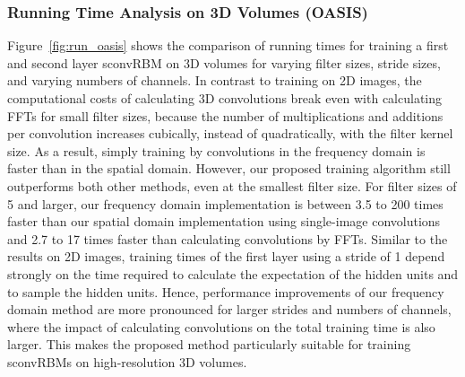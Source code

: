 \subsubsection{Running Time Analysis on 3D Volumes (OASIS)}

Figure~\ref{fig:run_oasis} shows the comparison of running times for training a
first  and second layer sconvRBM on 3D volumes for varying filter sizes, stride
sizes, and varying numbers of channels. In contrast to training on 2D images,
the computational costs of calculating 3D convolutions break even with
calculating FFTs for small filter sizes, because the number of multiplications
and additions per convolution increases cubically, instead of quadratically,
with the filter kernel size. As a result, simply training by convolutions in the
frequency domain is faster than in the spatial domain. However, our proposed
training algorithm still outperforms both other methods, even at the smallest
filter size. For filter sizes of 5 and larger, our frequency domain
implementation is between 3.5 to 200 times faster than our spatial domain
implementation using single-image convolutions and 2.7 to 17 times faster than
calculating convolutions by FFTs. Similar to the results on 2D images, training
times of the first layer using a stride of 1 depend strongly on the time
required to calculate the expectation of the hidden units and to sample the
hidden units. Hence, performance improvements of our frequency domain method are
more pronounced for larger strides and numbers of channels, where the impact of
calculating convolutions on the total training time is also larger. This makes
the proposed method particularly suitable for training sconvRBMs on
high-resolution 3D volumes.


